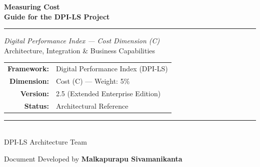 \documentclass[11pt,a4paper]{article}
\begin{document}
\begin{titlepage}
    \pagecolor{dpiblue}
    \color{white}
    \begin{center}
        \vspace*{3cm}
        
        {\Huge \textbf{Measuring Cost}} \\[0.7cm]
        {\LARGE \textbf{Guide for the DPI-LS Project}}
        
        \vspace{2cm}
        
        {\color{dpicloud}\rule{0.5\textwidth}{1.5pt}}
        
        \vspace{2cm}
        
        {\Large \textit{Digital Performance Index --- Cost Dimension (C)}} \\[1cm]
        
        {\large Architecture, Integration \& Business Capabilities}
        
        \vfill
        
        
        \renewcommand{\arraystretch}{1.3}
        \begin{tabular}{rl}
            \textbf{Framework:} & Digital Performance Index (DPI-LS) \\
            \textbf{Dimension:} & Cost (C) --- Weight: 5\% \\
            \textbf{Version:} & 2.5 (Extended Enterprise Edition) \\
            \textbf{Status:} & Architectural Reference \\
        \end{tabular}
        
        \vspace{2cm}
        
        {\color{dpicloud}\rule{0.5\textwidth}{1pt}} \\[0.5cm]
        
        {\large DPI-LS Architecture Team}
        
        \vspace{0.3cm}
        {\normalsize Document Developed by \textbf{Malkapurapu Sivamanikanta}}
        
        \vspace*{1cm}
    \end{center}
\end{titlepage}
\pagecolor{white}
\color{black}
\end{document}
